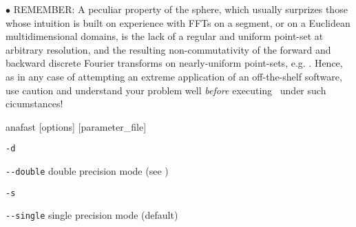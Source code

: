 \begin{recommend}
{$\bullet$ REMEMBER: 
A peculiar property of the sphere, which usually surprizes those 
whose intuition is built on experience with FFTs on a segment, or 
on a Euclidean multidimensional domains, is the lack of 
a regular and uniform point-set at arbitrary resolution, 
and the resulting non-commutativity of the forward and
backward discrete Fourier transforms on nearly-uniform point-sets,
e.g. {\healpix}. Hence,
as in any case of attempting an extreme application of an off-the-shelf
software, use caution and understand your problem well {\it before}
executing \thedocid\ under such cicumstances!
}
\end{recommend}

\begin{f90facility}
{anafast [options] [parameter\_file]}
\end{f90facility}

\begin{options}
  \begin{optionlistwide}{} %
    \item[{\tt -d}]
    \item[{\tt -}{\tt -}{\tt double}] double precision mode (see 
)
    \item[{\tt -s}]
    \item[{\tt -}{\tt -}{\tt single}] single precision mode (default)
  \end{optionlistwide}
\end{options}

